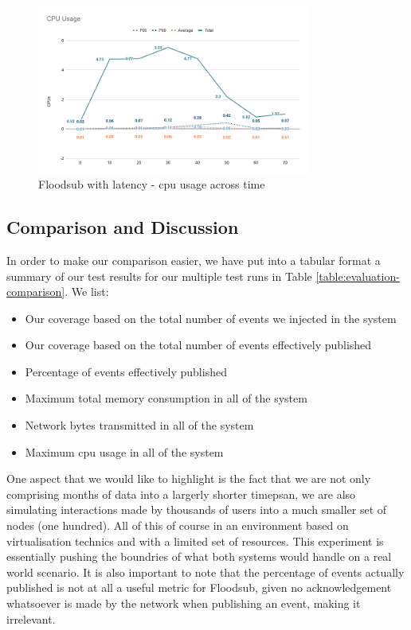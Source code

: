 \begin{figure}[!htb]
  \centering
  \includegraphics[width=0.8\textwidth]{img/graph-floodsub-cpu.png}
  \caption{Floodsub with latency - \acrshort{cpu} usage across time}
  \label{fig:graph-floodsub-latency-cpu}
\end{figure}

\subsection{Comparison and Discussion}\label{subsec:comparison}

In order to make our comparison easier, we have put into a tabular format a
summary of our test results for our multiple test runs in Table
\ref{table:evaluation-comparison}. We list:

\begin{itemize}
  \item Our coverage based on the total number of events we injected in the
    system
  \item Our coverage based on the total number of events effectively published
  \item Percentage of events effectively published
  \item Maximum total memory consumption in all of the system
  \item Network bytes transmitted in all of the system
  \item Maximum \acrshort{cpu} usage in all of the system
\end{itemize}

One aspect that we would like to highlight is the fact that we are not only
comprising months of data into a largerly shorter timepsan, we are also
simulating interactions made by thousands of users into a much smaller set of
nodes (one hundred). All of this of course in an environment based on
virtualisation technics and with a limited set of resources. This experiment is
essentially pushing the boundries of what both systems would handle on a real
world scenario. It is also important to note that the percentage of events
actually published is not at all a useful metric for Floodsub, given no
acknowledgement whatsoever is made by the network when publishing an event,
making it irrelevant.

